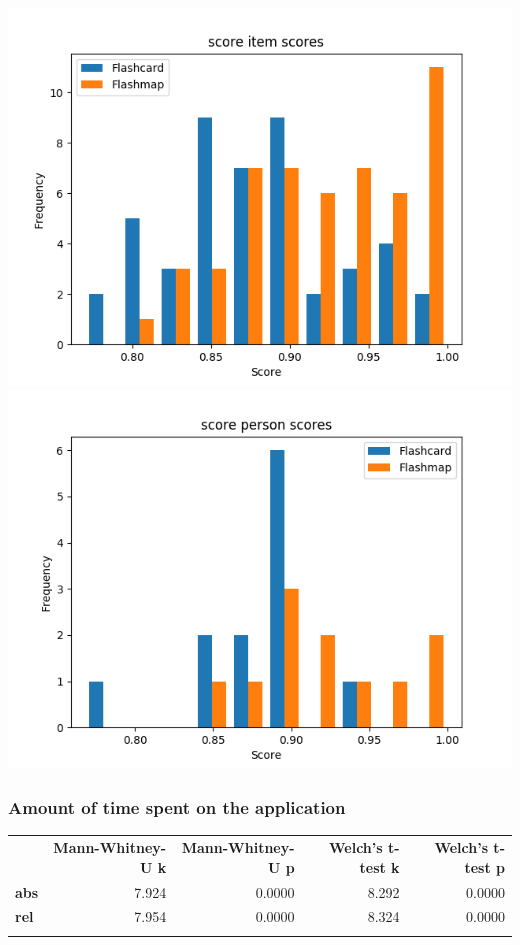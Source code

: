 \documentclass[]{article}
\begin{document}
\includegraphics{score_diff.png} \includegraphics{score_abil.png}

\subsubsection{Amount of time spent on the
application}\label{amount-of-time-spent-on-the-application-1}

\begin{longtable}[c]{@{}lrrrr@{}}
\toprule\addlinespace
& \textbf{Mann-Whitney-U k} & \textbf{Mann-Whitney-U p} &
\textbf{Welch's t-test k} & \textbf{Welch's t-test p}
\\\addlinespace
\midrule\endhead
\textbf{abs} & 7.924 & 0.0000 & 8.292 & 0.0000
\\\addlinespace
\textbf{rel} & 7.954 & 0.0000 & 8.324 & 0.0000
\\\addlinespace
\bottomrule
\end{longtable}
\end{document}
